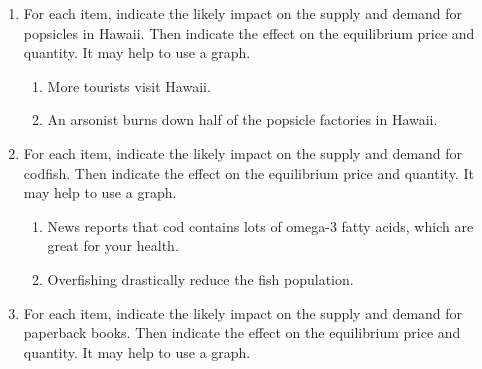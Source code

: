 \begin{enumerate}
\item For each item, indicate the likely impact on the supply and demand for popsicles in Hawaii. Then indicate the effect on the equilibrium price and quantity. It may help to use a graph.

    \begin{enumerate}
    \item More tourists visit Hawaii.
    \item An arsonist burns down half of the popsicle factories in Hawaii.
    \end{enumerate}








\item For each item, indicate the likely impact on the supply and demand for codfish. Then indicate the effect on the equilibrium price and quantity. It may help to use a graph.

    \begin{enumerate}
    \item News reports that cod contains lots of omega-3 fatty acids, which are great for your health.
    \item Overfishing drastically reduce the fish population.
    \end{enumerate}






\item For each item, indicate the likely impact on the supply and demand for paperback books. Then indicate the effect on the equilibrium price and quantity. It may help to use a graph.


\end{enumerate}
